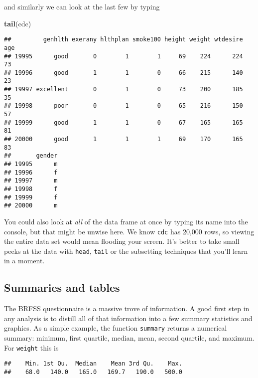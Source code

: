 \documentclass[]{article}
\newenvironment{Shaded}{\begin{snugshade}}{\end{snugshade}}
\newcommand{\KeywordTok}[1]{\textcolor[rgb]{0.13,0.29,0.53}{\textbf{#1}}}
\newcommand{\OperatorTok}[1]{\textcolor[rgb]{0.81,0.36,0.00}{\textbf{#1}}}
\newcommand{\NormalTok}[1]{#1}
\begin{document}
and similarly we can look at the last few by typing

\begin{Shaded}
\begin{Highlighting}[]
\KeywordTok{tail}\NormalTok{(cdc)}
\end{Highlighting}
\end{Shaded}

\begin{verbatim}
##         genhlth exerany hlthplan smoke100 height weight wtdesire age
## 19995      good       0        1        1     69    224      224  73
## 19996      good       1        1        0     66    215      140  23
## 19997 excellent       0        1        0     73    200      185  35
## 19998      poor       0        1        0     65    216      150  57
## 19999      good       1        1        0     67    165      165  81
## 20000      good       1        1        1     69    170      165  83
##       gender
## 19995      m
## 19996      f
## 19997      m
## 19998      f
## 19999      f
## 20000      m
\end{verbatim}

You could also look at \emph{all} of the data frame at once by typing
its name into the console, but that might be unwise here. We know
\texttt{cdc} has 20,000 rows, so viewing the entire data set would mean
flooding your screen. It's better to take small peeks at the data with
\texttt{head}, \texttt{tail} or the subsetting techniques that you'll
learn in a moment.

\subsection{Summaries and tables}\label{summaries-and-tables}

The BRFSS questionnaire is a massive trove of information. A good first
step in any analysis is to distill all of that information into a few
summary statistics and graphics. As a simple example, the function
\texttt{summary} returns a numerical summary: minimum, first quartile,
median, mean, second quartile, and maximum. For \texttt{weight} this is

\begin{Shaded}
\end{Shaded}

\begin{verbatim}
##    Min. 1st Qu.  Median    Mean 3rd Qu.    Max. 
##    68.0   140.0   165.0   169.7   190.0   500.0
\end{verbatim}
\end{document}
